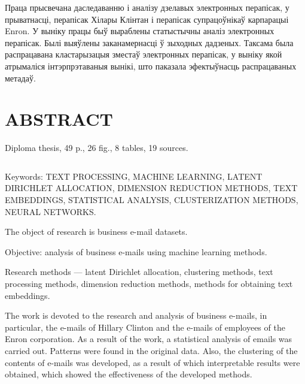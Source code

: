 Праца прысвечана даследаванню і аналізу дзелавых электронных перапісак, у прыватнасці, перапісак Хілары Клінтан і перапісак супрацоўнікаў карпарацыі Enron. У выніку працы быў выраблены статыстычны аналіз электронных перапісак. Былі выяўлены заканамернасці ў зыходных дадзеных. Таксама была распрацавана кластарызацыя зместаў электронных перапісак, у выніку якой атрымаліся інтэрпрэтаваныя вынікі, што паказала эфектыўнасць распрацаваных метадаў.



\chapter*{ABSTRACT}

Diploma thesis, 49 p., 26 fig., 8 tables, 19 sources.

$ $

Keywords: TEXT PROCESSING, MACHINE LEARNING, LATENT DIRICHLET ALLOCATION, DIMENSION REDUCTION METHODS, TEXT EMBEDDINGS, STATISTICAL ANALYSIS, CLUSTERIZATION METHODS, NEURAL NETWORKS.

\vspace{1.5 ex}
The object of research is business e-mail datasets.

Objective: analysis of business e-mails using machine learning methods.

Research methods --- latent Dirichlet allocation, clustering methods, text processing methods, dimension reduction methods, methods for obtaining text embeddings.

The work is devoted to the research and analysis of business e-mails, in particular, the e-mails of Hillary Clinton and the e-mails of employees of the Enron corporation. As a result of the work, a statistical analysis of emails was carried out. Patterns were found in the original data. Also, the clustering of the contents of e-mails was developed, as a result of which interpretable results were obtained, which showed the effectiveness of the developed methods.
